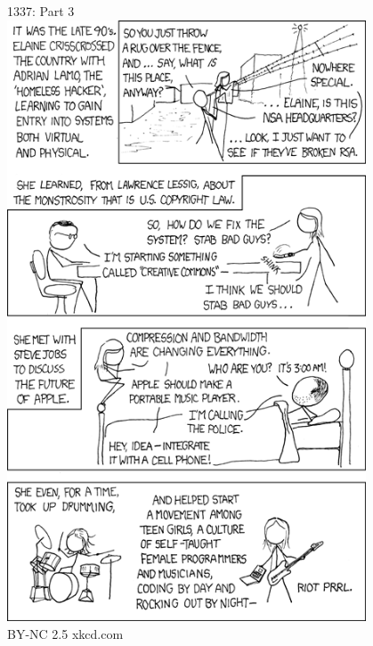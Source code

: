 \documentclass[a6paper,fontsize=10pt,twoside,open=right]{scrbook}
\begin{document}
\begin{center}
  \tiny{1337: Part 3}\\
  \includegraphics[keepaspectratio,width=0.8\textwidth]{elements/images/1337_part_3.png}\\
  \tiny{BY-NC 2.5 xkcd.com}
\end{center}\par
\vspace{10pt}
\vfill
\newpage
\null
\vfill
\end{document}
